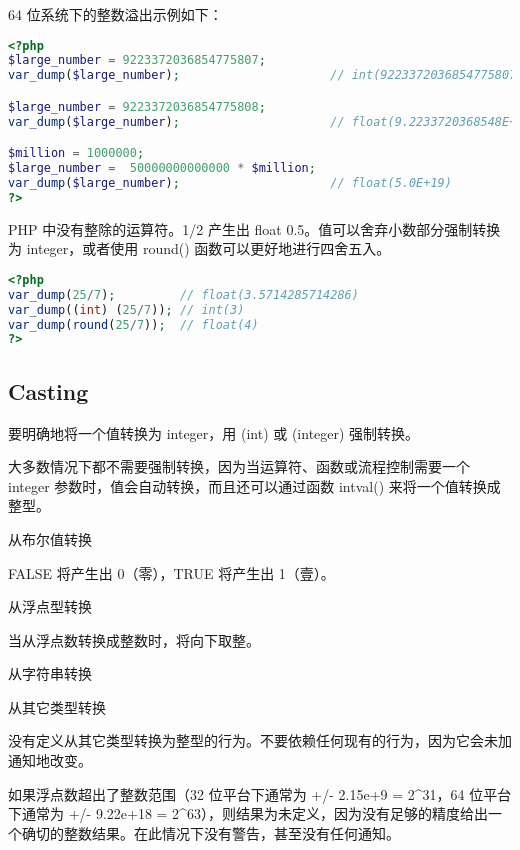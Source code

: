 64 位系统下的整数溢出示例如下：

\begin{lstlisting}[language=PHP]
<?php
$large_number = 9223372036854775807;
var_dump($large_number);                     // int(9223372036854775807)

$large_number = 9223372036854775808;
var_dump($large_number);                     // float(9.2233720368548E+18)

$million = 1000000;
$large_number =  50000000000000 * $million;
var_dump($large_number);                     // float(5.0E+19)
?>
\end{lstlisting}

PHP 中没有整除的运算符。1/2 产生出 float 0.5。值可以舍弃小数部分强制转换为 integer，或者使用 round() 函数可以更好地进行四舍五入。

\begin{lstlisting}[language=PHP]
<?php
var_dump(25/7);         // float(3.5714285714286) 
var_dump((int) (25/7)); // int(3)
var_dump(round(25/7));  // float(4) 
?>
\end{lstlisting}

\subsection{Casting}


要明确地将一个值转换为 integer，用 (int) 或 (integer) 强制转换。

大多数情况下都不需要强制转换，因为当运算符、函数或流程控制需要一个 integer 参数时，值会自动转换，而且还可以通过函数 intval() 来将一个值转换成整型。

\begin{compactitem}
\item 从布尔值转换

FALSE 将产生出 0（零），TRUE 将产生出 1（壹）。

\item 从浮点型转换

当从浮点数转换成整数时，将向下取整。

\item 从字符串转换

\item 从其它类型转换

没有定义从其它类型转换为整型的行为。不要依赖任何现有的行为，因为它会未加通知地改变。
\end{compactitem}


如果浮点数超出了整数范围（32 位平台下通常为 +/- 2.15e+9 = 2\^{}31，64 位平台下通常为 +/- 9.22e+18 = 2\^{}63），则结果为未定义，因为没有足够的精度给出一个确切的整数结果。在此情况下没有警告，甚至没有任何通知。

